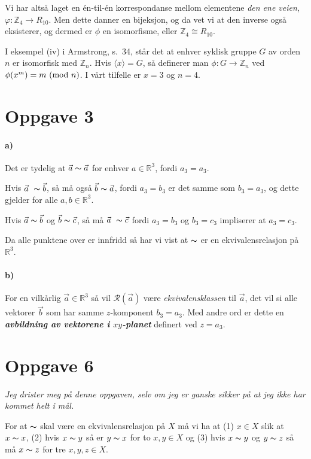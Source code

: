\documentclass[a4paper,norsk,twocolumn,10pt]{article}
\begin{document}
Vi har altså laget en én-til-én korrespondanse mellom elementene \textit{den
ene veien}, $\varphi\colon \mathbb{Z}_4 \rightarrow R_{10}$. Men dette danner
en bijeksjon, og da vet vi at den inverse også eksisterer, og dermed er $\phi$
en isomorfisme, eller $\mathbb{Z}_4 \cong R_{10}$.

I eksempel (iv) i Armstrong, s.~34, står det at enhver syklisk gruppe $G$ av
orden $n$ er isomorfisk med $\mathbb{Z}_n$. Hvis $\langle x \rangle = G$, så
definerer man $\phi\colon G \rightarrow \mathbb{Z}_n$ ved $\phi{(x^m)} = m
\ (\text{mod}\ n)$. I vårt tilfelle er $x=3$ og $n=4$.

\section*{Oppgave 3}
\paragraph{\textbf{a)}}
Det er tydelig at $\vec{a} \thicksim \vec{a}$ for enhver $a\in \mathbb{R}^3$,
fordi $a_3=a_3$.

Hvis $\vec{a} \thicksim \vec{b}$, så må også $\vec{b} \thicksim \vec{a}$, fordi
$a_3=b_3$ er det samme som $b_3=a_3$, og dette gjelder for alle $a,b \in
\mathbb{R}^3$.

Hvis $\vec{a} \thicksim \vec{b}$ og $\vec{b} \thicksim \vec{c}$, så må
$\vec{a} \thicksim \vec{c}$ fordi $a_3=b_3$ og $b_3=c_3$ impliserer at
$a_3=c_3$.

Da alle punktene over er innfridd så har vi vist at $\thicksim$ er en
ekvivalensrelasjon på $\mathbb{R}^3$.

\paragraph{\textbf{b)}}
For en vilkårlig $\vec{a} \in \mathbb{R}^3$ så vil $\mathscr{R}(\vec{a})$ være
\textit{ekvivalensklassen} til $\vec{a}$, det vil si alle vektorer $\vec{b}$
som har samme $z$-komponent $b_3=a_3$. Med andre ord er dette en
\textbf{\textit{avbildning av vektorene i $xy$-planet}}
definert ved $z=a_3$.

\section*{Oppgave 6}
\textit{Jeg drister meg på denne oppgaven, selv om jeg er ganske sikker på at
jeg ikke har kommet helt i mål.}

For at $\thicksim$ skal være en ekvivalensrelasjon på $X$ må vi ha at (1) $x\in
X$ slik at $x \thicksim x$, (2) hvis $x \thicksim y$ så er $y \thicksim x$ for
to $x,y \in X$ og (3) hvis $x \thicksim y$ og $y \thicksim z$ så må $x
\thicksim z$ for tre $x,y,z \in X$.
\end{document}
